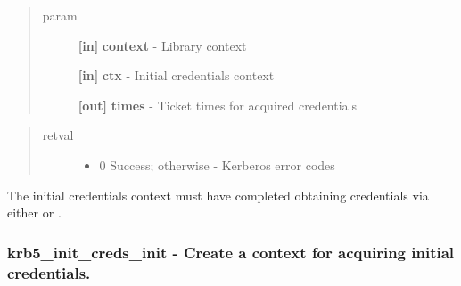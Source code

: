 \documentclass[letterpaper,10pt,english]{sphinxmanual}
\begin{document}
\begin{quote}\begin{description}
\item[{param}] \leavevmode
\textbf{{[}in{]}} \textbf{context} - Library context

\textbf{{[}in{]}} \textbf{ctx} - Initial credentials context

\textbf{{[}out{]}} \textbf{times} - Ticket times for acquired credentials

\end{description}\end{quote}
\begin{quote}\begin{description}
\item[{retval}] \leavevmode\begin{itemize}
\item {} 
0   Success; otherwise - Kerberos error codes

\end{itemize}

\end{description}\end{quote}

The initial credentials context must have completed obtaining credentials via either {\hyperref[appdev/refs/api/krb5_init_creds_get:c.krb5_init_creds_get]{}} or {\hyperref[appdev/refs/api/krb5_init_creds_step:c.krb5_init_creds_step]{}} .


\subsubsection{krb5\_init\_creds\_init -  Create a context for acquiring initial credentials.}
\label{appdev/refs/api/krb5_init_creds_init::doc}\label{appdev/refs/api/krb5_init_creds_init:krb5-init-creds-init-create-a-context-for-acquiring-initial-credentials}

\begin{fulllineitems}
\label{appdev/refs/api/krb5_init_creds_init:c.krb5_init_creds_init}
\end{fulllineitems}
\end{document}
